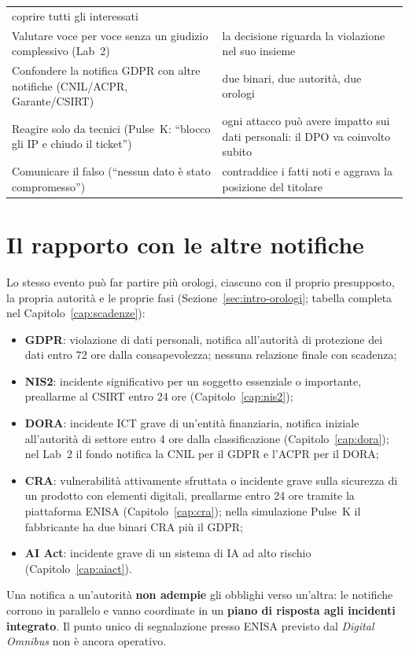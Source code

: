\begin{longtable}{>{\raggedright\arraybackslash}p{6.4cm} >{\raggedright\arraybackslash}p{7.8cm}}
  coprire tutti gli interessati\\
Valutare voce per voce senza un giudizio complessivo (Lab~2) & la decisione riguarda la violazione nel
  suo insieme\\
Confondere la notifica GDPR con altre notifiche (CNIL/ACPR, Garante/CSIRT) & due binari, due autorità,
  due orologi\\
Reagire solo da tecnici (Pulse~K: ``blocco gli IP e chiudo il ticket'') & ogni attacco può avere impatto
  sui dati personali: il DPO va coinvolto subito\\
Comunicare il falso (``nessun dato è stato compromesso'') & contraddice i fatti noti e aggrava la
  posizione del titolare\\
\bottomrule
\end{longtable}
\endgroup

\section{Il rapporto con le altre notifiche}
\label{sec:breach-altre}

Lo stesso evento può far partire più orologi, ciascuno con il proprio presupposto, la propria autorità e
le proprie fasi (Sezione~\ref{sec:intro-orologi}; tabella completa nel Capitolo~\ref{cap:scadenze}):
\begin{itemize}
  \item \textbf{GDPR}: violazione di dati personali, notifica all'autorità di protezione dei dati entro 72
    ore dalla consapevolezza; nessuna relazione finale con scadenza;
  \item \textbf{NIS2}: incidente significativo per un soggetto essenziale o importante, preallarme al CSIRT
    entro 24 ore (Capitolo~\ref{cap:nis2});
  \item \textbf{DORA}: incidente ICT grave di un'entità finanziaria, notifica iniziale all'autorità di
    settore entro 4 ore dalla classificazione (Capitolo~\ref{cap:dora}); nel Lab~2 il fondo notifica la
    CNIL per il GDPR e l'ACPR per il DORA;
  \item \textbf{CRA}: vulnerabilità attivamente sfruttata o incidente grave sulla sicurezza di un prodotto
    con elementi digitali, preallarme entro 24 ore tramite la piattaforma ENISA (Capitolo~\ref{cap:cra});
    nella simulazione Pulse~K il fabbricante ha due binari CRA più il GDPR;
  \item \textbf{AI Act}: incidente grave di un sistema di IA ad alto rischio (Capitolo~\ref{cap:aiact}).
\end{itemize}
Una notifica a un'autorità \textbf{non adempie} gli obblighi verso un'altra: le notifiche corrono in
parallelo e vanno coordinate in un \textbf{piano di risposta agli incidenti integrato}. Il punto unico di
segnalazione presso ENISA previsto dal \emph{Digital Omnibus} non è ancora operativo.

